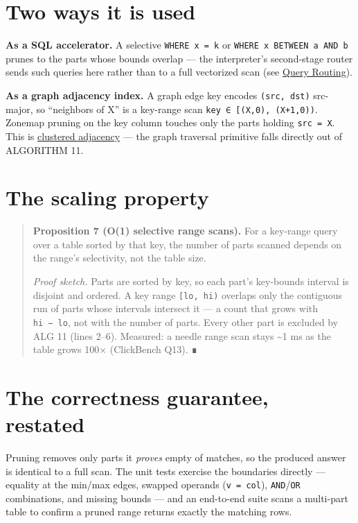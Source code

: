 \documentclass[
  11pt,
  openany]{book}
\begin{document}
\section{Two ways it is used}\label{two-ways-it-is-used}

\textbf{As a SQL accelerator.} A selective \texttt{WHERE\ x\ =\ k} or
\texttt{WHERE\ x\ BETWEEN\ a\ AND\ b} prunes to the parts whose bounds
overlap --- the interpreter's second-stage router sends such queries
here rather than to a full vectorized scan (see
\href{query-router.md}{Query Routing}).

\textbf{As a graph adjacency index.} A graph edge key encodes
\texttt{(src,\ dst)} src-major, so ``neighbors of X'' is a key-range
scan \texttt{key\ ∈\ {[}(X,0),\ (X+1,0))}. Zonemap pruning on the key
column touches only the parts holding \texttt{src\ =\ X}. This is
\href{../graph/model.md}{clustered adjacency} --- the graph traversal
primitive falls directly out of ALGORITHM 11.

\section{The scaling property}\label{the-scaling-property}

\begin{quote}
\textbf{Proposition 7 (O(1) selective range scans).} For a key-range
query over a table sorted by that key, the number of parts scanned
depends on the range's selectivity, not the table size.

\emph{Proof sketch.} Parts are sorted by key, so each part's key-bounds
interval is disjoint and ordered. A key range \texttt{{[}lo,\ hi)}
overlaps only the contiguous run of parts whose intervals intersect it
--- a count that grows with \texttt{hi\ −\ lo}, not with the number of
parts. Every other part is excluded by ALG 11 (lines 2--6). Measured: a
needle range scan stays \textasciitilde1 ms as the table grows 100×
(ClickBench Q13). ∎
\end{quote}

\section{The correctness guarantee,
restated}\label{the-correctness-guarantee-restated}

Pruning removes only parts it \emph{proves} empty of matches, so the
produced answer is identical to a full scan. The unit tests exercise the
boundaries directly --- equality at the min/max edges, swapped operands
(\texttt{v\ =\ col}), \texttt{AND}/\texttt{OR} combinations, and missing
bounds --- and an end-to-end suite scans a multi-part table to confirm a
pruned range returns exactly the matching rows.
\end{document}
